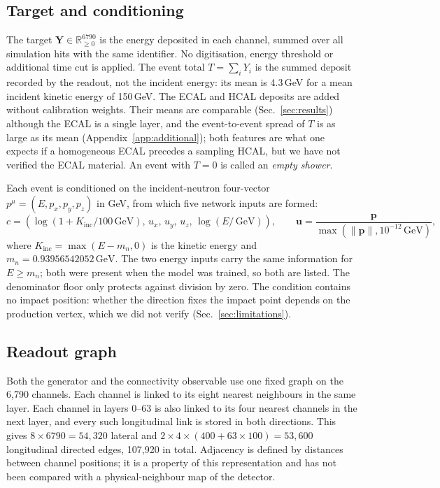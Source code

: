 \documentclass[11pt]{article}
\newcommand{\GeV}{\,\mathrm{GeV}}
\newcommand{\Kinc}{K_{\mathrm{inc}}}
\newcommand{\Y}{\mathbf{Y}}
\begin{document}
\subsection{Target and conditioning}

The target $\Y\in\mathbb R_{\geq0}^{6790}$ is the energy deposited in each channel, summed over all simulation hits with the same identifier. No digitisation, energy threshold or additional time cut is applied. The event total $T=\sum_i Y_i$ is the summed deposit recorded by the readout, not the incident energy: its mean is 4.3\,GeV for a mean incident kinetic energy of 150\,GeV. The ECAL and HCAL deposits are added without calibration weights. Their means are comparable (Sec.~\ref{sec:results}) although the ECAL is a single layer, and the event-to-event spread of $T$ is as large as its mean (Appendix~\ref{app:additional}); both features are what one expects if a homogeneous ECAL precedes a sampling HCAL, but we have not verified the ECAL material. An event with $T=0$ is called an \emph{empty shower}.

Each event is conditioned on the incident-neutron four-vector $p^\mu=(E,p_x,p_y,p_z)$ in GeV, from which five network inputs are formed:
\begin{equation}
 c=\left(\log(1+\Kinc/100\GeV),\,u_x,\,u_y,\,u_z,\,\log(E/\GeV)\right),
 \qquad \mathbf u=\frac{\mathbf p}{\max(\lVert\mathbf p\rVert,10^{-12}\GeV)},
 \label{eq:condition}
\end{equation}
where $\Kinc=\max(E-m_n,0)$ is the kinetic energy and $m_n=0.93956542052\GeV$. The two energy inputs carry the same information for $E\geq m_n$; both were present when the model was trained, so both are listed. The denominator floor only protects against division by zero. The condition contains no impact position: whether the direction fixes the impact point depends on the production vertex, which we did not verify (Sec.~\ref{sec:limitations}).

\subsection{Readout graph}

Both the generator and the connectivity observable use one fixed graph on the 6,790 channels. Each channel is linked to its eight nearest neighbours in the same layer. Each channel in layers 0--63 is also linked to its four nearest channels in the next layer, and every such longitudinal link is stored in both directions. This gives $8\times6790=54{,}320$ lateral and $2\times4\times(400+63\times100)=53{,}600$ longitudinal directed edges, 107,920 in total. Adjacency is defined by distances between channel positions; it is a property of this representation and has not been compared with a physical-neighbour map of the detector.
\end{document}
